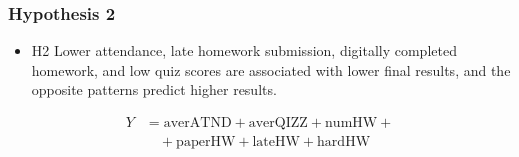 \documentclass{beamer} %
\theoremstyle{definition}
\begin{document}
	
	
	\begin{frame}
		\frametitle{Hypothesis 2}
		\centering
		\begin{itemize}
			\item H2 Lower attendance, late homework submission, digitally completed homework, and low quiz scores are associated with lower final results, and the opposite patterns predict higher results.
		\end{itemize}
		\vspace{1em}
		\begin{equation*}
			\begin{aligned}
				Y &= \mathrm{averATND} + \mathrm{averQIZZ} + \mathrm{numHW} +   \\
				&\quad + \mathrm{paperHW} + \mathrm{lateHW} + \mathrm{hardHW} 
			\end{aligned}
		\end{equation*}		
	\end{frame}
	
\end{document}
